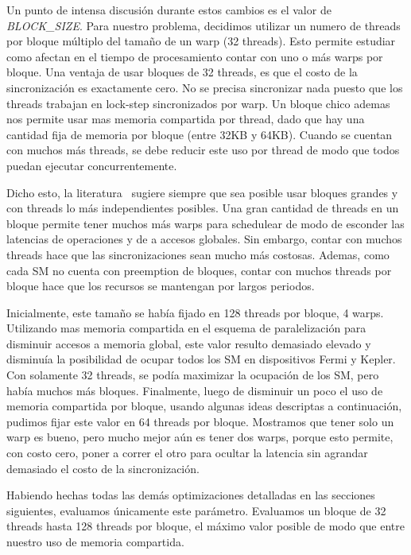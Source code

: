 Un punto de intensa discusi\'on durante estos cambios es el valor de \textit{BLOCK\_SIZE}.
Para nuestro problema, decidimos utilizar un numero de threads por bloque m\'ultiplo del
tama\~no de un warp (32 threads). Esto permite estudiar como afectan en el tiempo de
procesamiento contar con uno o m\'as warps por bloque. Una ventaja de usar bloques de
32 threads, es que el costo de la sincronizaci\'on es exactamente cero. No se precisa
sincronizar nada puesto que los threads trabajan en lock-step sincronizados por warp.
Un bloque chico ademas nos permite usar mas memoria compartida por thread, dado que hay una
cantidad fija de memoria por bloque (entre 32KB y 64KB). Cuando se cuentan con muchos m\'as
threads, se debe reducir este uso por thread de modo que todos puedan ejecutar concurrentemente.

Dicho esto, la literatura~\cite{farberCuda} sugiere siempre que sea posible
usar bloques grandes y con threads lo m\'as independientes posibles. Una gran cantidad de threads
en un bloque permite tener muchos m\'as warps para schedulear de modo de esconder las latencias de
operaciones y de a accesos globales. Sin embargo, contar con muchos threads hace que las
sincronizaciones sean mucho m\'as costosas. Ademas, como cada SM no cuenta con preemption
de bloques, contar con muchos threads por bloque hace que los recursos se mantengan
por largos periodos.

Inicialmente, este tama\~no se hab\'ia fijado en 128 threads por bloque, 4 warps. Utilizando
mas memoria compartida en el esquema de paralelizaci\'on para disminuir accesos a memoria global,
este valor resulto demasiado elevado y disminu\'ia la posibilidad de ocupar todos los SM en dispositivos
Fermi y Kepler. Con solamente 32 threads, se pod\'ia maximizar la ocupaci\'on de los SM, pero hab\'ia
muchos m\'as bloques. Finalmente, luego de disminuir un poco el uso de memoria compartida por
bloque, usando algunas ideas descriptas a continuaci\'on, pudimos fijar este valor en 64 threads
por bloque. Mostramos que tener solo un warp es bueno, pero mucho mejor a\'un es tener dos warps, porque
esto permite, con costo cero, poner a correr el otro para ocultar la latencia sin agrandar
demasiado el costo de la sincronizaci\'on.

Habiendo hechas todas las dem\'as optimizaciones detalladas en las secciones siguientes, evaluamos
\'unicamente este par\'ametro. Evaluamos un bloque de 32 threads hasta 128 threads por bloque,
el m\'aximo valor posible de modo que entre nuestro uso de memoria compartida.

